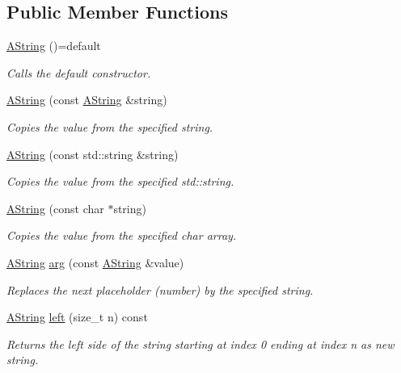 \subsection*{Public Member Functions}
\begin{DoxyCompactItemize}
\item 
\mbox{\label{class_a_string_a448a659ba1ce4f66d4df8517b7267825}} 
\mbox{\hyperlink{class_a_string_a448a659ba1ce4f66d4df8517b7267825}{A\+String}} ()=default
\begin{DoxyCompactList}\small\item\em Calls the default constructor. \end{DoxyCompactList}\item 
\mbox{\hyperlink{class_a_string_a0d8d5ba424e88b1a4b466c63f9d32d6d}{A\+String}} (const \mbox{\hyperlink{class_a_string}{A\+String}} \&string)
\begin{DoxyCompactList}\small\item\em Copies the value from the specified string. \end{DoxyCompactList}\item 
\mbox{\hyperlink{class_a_string_a97a4d0d44621ca901455777c857f9032}{A\+String}} (const std\+::string \&string)
\begin{DoxyCompactList}\small\item\em Copies the value from the specified std\+::string. \end{DoxyCompactList}\item 
\mbox{\hyperlink{class_a_string_a2cf05e679f64fb2d5e6e4154d6f7abcd}{A\+String}} (const char $\ast$string)
\begin{DoxyCompactList}\small\item\em Copies the value from the specified char array. \end{DoxyCompactList}\item 
\mbox{\hyperlink{class_a_string}{A\+String}} \mbox{\hyperlink{class_a_string_abe25a22470606db76c275a7d73563bf6}{arg}} (const \mbox{\hyperlink{class_a_string}{A\+String}} \&value)
\begin{DoxyCompactList}\small\item\em Replaces the next placeholder (number) by the specified string. \end{DoxyCompactList}\item 
\mbox{\hyperlink{class_a_string}{A\+String}} \mbox{\hyperlink{class_a_string_a36d25fc88d7f9eccee2b7d0659c19d64}{left}} (size\+\_\+t n) const
\begin{DoxyCompactList}\small\item\em Returns the left side of the string starting at index 0 ending at index n as new string. \end{DoxyCompactList}\item 

\end{DoxyCompactItemize}

